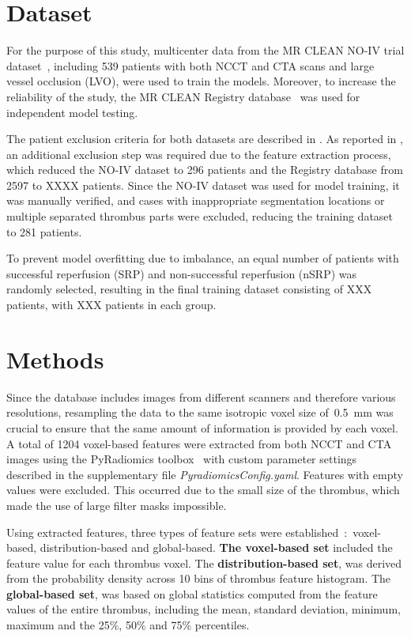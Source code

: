 \documentclass[preprint,12pt]{elsarticle}
\begin{document}
\section{Dataset}

For the purpose of this study, multicenter data from the MR CLEAN NO-IV trial dataset~\cite{Jansen2018}, including 539 patients with both NCCT and CTA scans and large vessel occlusion (LVO), were used to train the models. Moreover, to increase the reliability of the study, the MR CLEAN Registry database~\cite{IvoGHJansen20180309} was used for independent model testing. 

The patient exclusion criteria for both datasets are described in \cite{Mojtahedi2024}. As reported in \cite{Nemcekova2025}, an additional exclusion step was required due to the feature extraction process, which reduced the NO-IV dataset to 296 patients and the Registry database from 2597 to XXXX patients. Since the NO-IV dataset was used for model training, it was manually verified, and cases with inappropriate segmentation locations or multiple separated thrombus parts were excluded, reducing the training dataset to 281 patients. 

To prevent model overfitting due to imbalance, an equal number of patients with successful reperfusion (SRP) and non-successful reperfusion (nSRP) was randomly selected, resulting in the final training dataset consisting of XXX patients, with XXX patients in each group.  

\section{Methods}
Since the database includes images from different scanners and therefore various resolutions, resampling the data to the same isotropic voxel size of~0.5~mm was crucial to ensure that the same amount of information is provided by each voxel. A total of 1204 voxel-based features were extracted from both NCCT and CTA images using the PyRadiomics toolbox~\cite{VanGriethuysen20171031} with custom parameter settings described in the supplementary file \textit{PyradiomicsConfig.yaml}. Features with empty values were excluded. This occurred due to the small size of the thrombus, which made the use of large filter masks impossible. 

Using extracted features, three types of feature sets were established~:~voxel-based, distribution-based and global-based. \textbf{The voxel-based set} included the feature value for each thrombus voxel. The \textbf{distribution-based set}, was derived from the probability density across 10 bins of thrombus feature histogram. The \textbf{global-based set}, was based on global statistics computed from the feature values of the entire thrombus, including the mean, standard deviation, minimum, maximum and the 25\%, 50\% and 75\% percentiles. 
\end{document}
